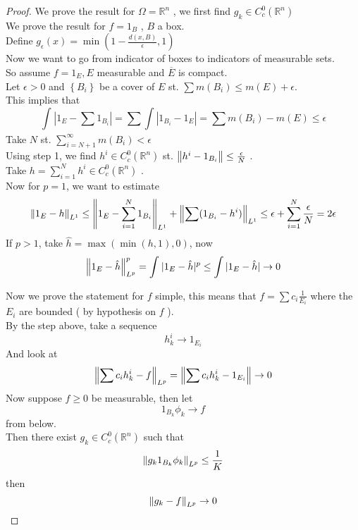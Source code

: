 \documentclass[../main.tex]{subfiles}
\begin{document}
\begin{proof}
We prove the result for $\Omega= \mathbb{R}^{n}$ , we first find $g_k \in C_c^{0}( \mathbb{R}^n) $ \\
We prove the result for $f= 1_B$ , $B$ a box.\\
Define $g_\epsilon( x) = \min( 1- \frac{d( x,B) }{\epsilon},1) $ \\
Now we want to go from indicator of boxes to indicators of measurable sets.\\
So assume $f= 1_E, E$ measurable and $ \overline{E}$ is compact.\\
Let $\epsilon>0$ and $ \left\{ B_i \right\} $ be a cover of $E$ st. $\sum m( B_i) \leq m( E)  +\epsilon$.\\
This implies that
\[ 
\int_{  }^{  } |1_E - \sum 1_{ B_i }| = \sum \int |1_{B_i} -1_E| = \sum m( B_i) - m( E) \leq \epsilon
\]
Take $N$ st. $\sum_{i=N+1}^{ \infty } m( B_i) < \epsilon$ \\
Using step 1, we find $h^{i} \in C_c^{0}( \mathbb{R}^n) $ st. $ \left\lVert h^{i}- 1_{B_i} \right\rVert \leq \frac{\epsilon}{N} $ .\\
Take $h = \sum_{i=1}^{N } h^{i} \in C_c^{0}(  \mathbb{R}^n) $ .\\
Now for $p=1$, we want to estimate
\[ 
\left\lVert 1_E - h\right\rVert_{L^{1}} \leq \left\lVert 1_E - \sum_{i=1}^{ N}1_{B_i} \right\rVert _{L^{1}} + \left\lVert \sum ( 1_{B_i} - h^{i}) \right\rVert_{L^{1}} \leq \epsilon + \sum_{i=1}^{ N} \frac{\epsilon}{N} = 2\epsilon
\]
If $p>1$, take $ \hat{h}= \max( \min( h , 1),0) $, now
\[ 
\left\lVert 1_E - \hat{h}\right\rVert _{L^{p}} ^{p} = \int_{  }^{  } |1_E - \hat{h}|^{p} \leq \int |1_E - \hat{h}| \to 0
\]

Now we prove the statement for $f$ simple, this means that $ f= \sum c_i \frac{1}{E_i}$ where the $E_i$ are bounded ( by hypothesis on $f$ ).\\
By the step above, take a sequence 	
\[ 
h^{i}_k \to 1_{E_i} 
\]
And look at 
\[ 
	\left\lVert \sum c_i h^{i}_k - f\right\rVert_{L^{p}}  = \left\lVert \sum c_i h^{i}_k - 1_{E_i}  \right\rVert\to 0	
\]
Now suppose $f \geq 0$ be measurable, then let 
\[ 
1_{B_k} \phi_k \to f
\]
from below.\\
Then there exist $g_k \in C^{0}_c ( \mathbb{R}^n) $ such that
\[ 
\left\lVert g_k 1_{B_k} \phi_k\right\rVert_{L^{p}} \leq \frac{1}{K}
\]
then
\[ 
\left\lVert g_k -f\right\rVert _{L^{p}} \to 0
\]

	

\end{proof}
\end{document}
